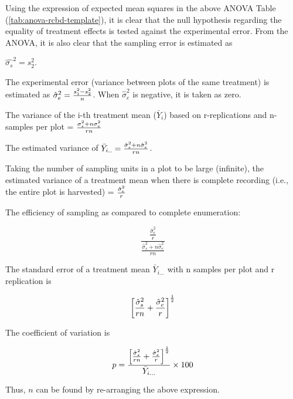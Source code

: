 \documentclass[
  ignorenonframetext,
  aspectratio=169]{beamer}
\begin{document}
\begin{frame}{}
\protect\hypertarget{section-10}{}
\small

Using the expression of expected mean squares in the above ANOVA Table
(\ref{tab:anova-rcbd-template}), it is clear that the null hypothesis
regarding the equality of treatment effects is tested against the
experimental error. From the ANOVA, it is also clear that the sampling
error is estimated as

\(\hat{\sigma_s}^2 = s_2^2\).

The experimental error (variance between plots of the same treatment) is
estimated as \(\large \hat{\sigma}_e^2 = \frac{s_1^2 - s_2^2}{n}\). When
\(\hat{\sigma}_e^2\) is negative, it is taken as zero.

The variance of the i-th treatment mean (\(\bar{Y}_i\)) based on
r-replications and n-samples per plot =
\({\large \frac{\sigma_s^2 + n \sigma_e^2}{rn}}\)

The estimated variance of
\(\large \bar{Y}_{i..} = \frac{\hat{\sigma}_s^2 + n\hat{\sigma}_e^2}{rn}\).

Taking the number of sampling units in a plot to be large (infinite),
the estimated variance of a treatment mean when there is complete
recording (i.e., the entire plot is harvested) =
\(\large \frac{\hat{\sigma}_e^2}{r}\)
\end{frame}

\begin{frame}{}
\protect\hypertarget{section-11}{}
\small

The efficiency of sampling as compared to complete enumeration:

\[
\frac{\frac{\hat{\sigma}_e^2}{r}}{\frac{\hat{\sigma}_s^2 + n \hat{\sigma}_e^2}{rn}}
\]

The standard error of a treatment mean \(\bar{Y}_{i...}\) with n samples
per plot and r replication is

\[
\small
\left[ \frac{\hat{\sigma}_s^2}{rn} + \frac{\hat{\sigma}_e^2}{r} \right]^{\frac{1}{2}}
\]

The coefficient of variation is

\[
\small 
p = \frac{\left[ \frac{\hat{\sigma}_s^2}{rn} + \frac{\hat{\sigma}_e^2}{r} \right]^{\frac{1}{2}}}{\bar{Y}_{i...}} \times 100
\]

Thus, \(n\) can be found by re-arranging the above expression.
\end{frame}
\end{document}
